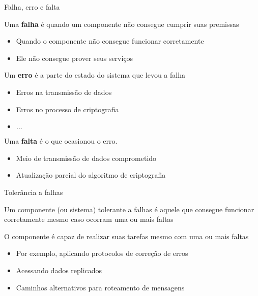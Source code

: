 \documentclass[compress]{beamer}
\begin{document}
\begin{frame}{Falha, erro e falta}

Uma \textbf{falha} é quando um componente não consegue cumprir suas premissas
\begin{itemize}
    \item Quando o componente não consegue funcionar corretamente
    \item Ele não consegue prover seus serviços
\end{itemize}

\vspace{0.5cm}

Um \textbf{erro} é a parte do estado do sistema que levou a falha
\begin{itemize}
    \item Erros na transmissão de dados
    \item Erros no processo de criptografia
    \item $\ldots$
\end{itemize}

\vspace{0.5cm}

Uma \textbf{falta} é o que ocasionou o erro.
\begin{itemize}
    \item Meio de transmissão de dados comprometido
    \item Atualização parcial do algoritmo de criptografia
\end{itemize}
\end{frame}


\begin{frame}{Tolerância a falhas}

Um componente (ou sistema) tolerante a falhas é aquele que consegue funcionar corretamente mesmo caso ocorram uma ou mais faltas

\vspace{0.5cm}

O componente é capaz de realizar suas tarefas mesmo com uma ou mais faltas
\begin{itemize}
    \item Por exemplo, aplicando protocolos de correção de erros
    \item Acessando dados replicados
    \item Caminhos alternativos para roteamento de mensagens
\end{itemize}

\end{frame}
\end{document}
